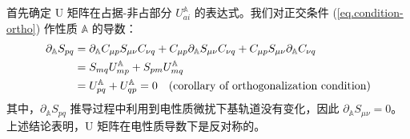 首先确定 U 矩阵在占据-非占部分 $U_{ai}^\mathbb{A}$ 的表达式。我们对正交条件 (\ref{eq.condition-ortho}) 作性质 $\mathbb{A}$ 的导数：
\begin{align}
  \label{eq.condition-ortho-conclusion}
  \partial_{\mathbb{A}} S_{pq} &= \partial_\mathbb{A} C_{\mu p} S_{\mu \nu} C_{\nu q} + C_{\mu p} \partial_\mathbb{A} S_{\mu \nu} C_{\nu q} + C_{\mu p} S_{\mu \nu} \partial_\mathbb{A} C_{\nu q} \notag\\
  &= S_{mq} U_{mp}^\mathbb{A} + S_{pm} U_{mq}^\mathbb{A} \notag\\
  &= U_{pq}^\mathbb{A} + U_{qp}^\mathbb{A} = 0 \quad \text{(corollary of orthogonalization condition)}
\end{align}
其中，$\partial_\mathbb{A} S_{pq}$ 推导过程中利用到电性质微扰下基轨道没有变化，因此 $\partial_\mathbb{A} S_{\mu \nu} = 0$。上述结论表明，U 矩阵在电性质导数下是反对称的。

